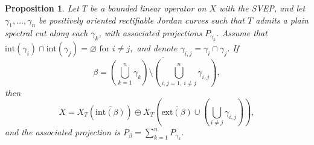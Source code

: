 \documentclass[10pt,a4paper]{amsart}
\newtheorem{proposition}{Proposition}
\begin{document}
\begin{proposition}\label{proposicion union curvas que cortan}
Let $T$ be a bounded linear operator on $X$ with the SVEP, and let $\gamma_1,\ldots,\gamma_n$ be positively oriented rectifiable Jordan curves such that $T$ admits a plain spectral cut along each $\gamma_k$, with associated projections $P_{\gamma_k}$. Assume that
$\mathrm{int}(\gamma_i)\cap \mathrm{int}(\gamma_j)=\varnothing \text{ for } i\neq j,
$ and denote $\gamma_{i,j}=\gamma_i\cap\gamma_j$. If
$$
\beta=\overline{(\bigcup\limits_{k=1}^n \gamma_k)\setminus \left(\bigcup_{i,j=1, \ i\neq j}^n \gamma_{i,j} \right) },
$$
then
$$
X = X_T\!\left(\overline{\mathrm{int}(\beta)}\right)
\oplus
X_T\!\left(\overline{\mathrm{ext}(\beta)} \cup
\left(\bigcup_{i\neq j}\gamma_{i,j}\right)\right),
$$
and the associated projection is $P_{\beta}=\sum_{k=1}^n P_{\gamma_k}$.
\end{proposition}
\end{document}
